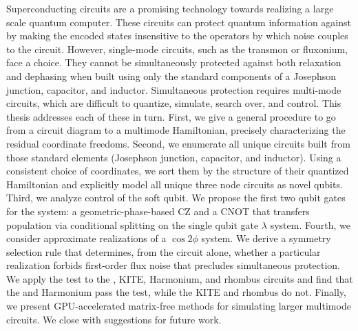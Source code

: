 Superconducting circuits are a promising technology towards realizing a large scale quantum computer.
These circuits can protect quantum information against by making the encoded states insensitive to the operators by which noise couples to the circuit.
However, single-mode circuits, such as the transmon or fluxonium, face a choice.
They cannot be simultaneously protected against both relaxation and dephasing when built using only the standard components of a Josephson junction, capacitor, and inductor.
Simultaneous protection requires multi-mode circuits, which are difficult to quantize, simulate, search over, and control.
This thesis addresses each of these in turn.
First, we give a general procedure to go from a circuit diagram to a multimode Hamiltonian, precisely characterizing the residual coordinate freedoms.
Second, we enumerate all unique circuits built from those standard elements (Josephson junction, capacitor, and inductor).
Using a consistent choice of coordinates, we sort them by the structure of their quantized Hamiltonian and explicitly model all unique three node circuits as novel qubits.
Third, we analyze control of the soft \zp qubit.
We propose the first two qubit gates for the system: a geometric-phase-based CZ and a CNOT that transfers population via conditional splitting on the single qubit gate $\lambda$ system.
Fourth, we consider approximate realizations of a $\cos2\phi$ system.
We derive a symmetry selection rule that determines, from the circuit alone, whether a particular realization forbids first-order flux noise that precludes simultaneous protection.
We apply the test to the \zp, KITE, Harmonium, and rhombus circuits and find that the \zp and Harmonium pass the test, while the KITE and rhombus do not.
Finally, we present GPU-accelerated matrix-free methods for simulating larger multimode circuits.
We close with suggestions for future work.
